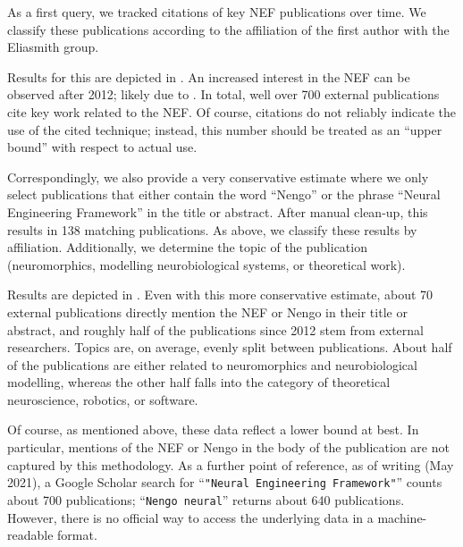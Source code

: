 As a first query, we tracked citations of key NEF publications \citep[specifically][]{eliasmith2003neural,eliasmith2013how,bekolay2014nengo} over time.
We classify these publications according to the affiliation of the first author with the Eliasmith group.

Results for this are depicted in .
An increased interest in the NEF can be observed after 2012; likely due to \citet{eliasmith2012largescale}.
In total, well over 700 external publications cite key work related to the NEF.
Of course, citations do not reliably indicate the use of the cited technique; instead, this number should be treated as an \enquote{upper bound} with respect to actual use.

Correspondingly, we also provide a very conservative estimate where we only select publications that either contain the word \enquote{Nengo} or the phrase \enquote{Neural Engineering Framework} in the title or abstract.
After manual clean-up, this results in 138 matching publications.
As above, we classify these results by affiliation.
Additionally, we determine the topic of the publication (neuromorphics, modelling neurobiological systems, or theoretical work).

Results are depicted in  .
Even with this more conservative estimate, about 70 external publications directly mention the NEF or Nengo in their title or abstract, and roughly half of the publications since 2012 stem from external researchers.
Topics are, on average, evenly split between publications.
About half of the publications are either related to neuromorphics and neurobiological modelling, whereas the other half falls into the category of theoretical neuroscience, robotics, or software.

Of course, as mentioned above, these data reflect a lower bound at best.
In particular, mentions of the NEF or Nengo in the body of the publication are not captured by this methodology.
As a further point of reference, as of writing (May 2021), a Google Scholar search for \enquote{\texttt{"Neural Engineering Framework"}} counts about 700 publications; \enquote{\texttt{Nengo neural}} returns about 640 publications.
However, there is no official way to access the underlying data in a machine-readable format.
